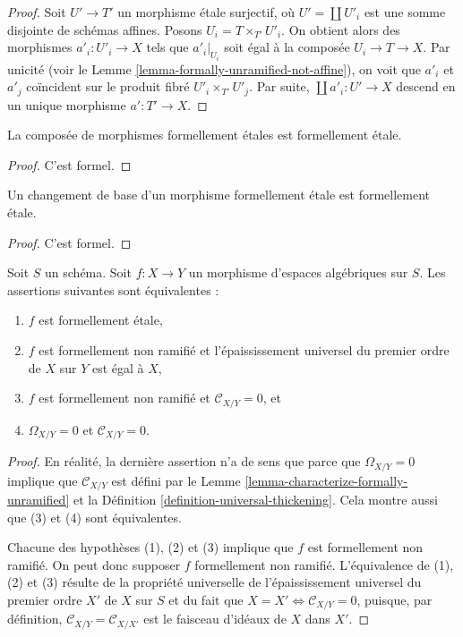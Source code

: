 \begin{proof}
Soit $U' \to T'$ un morphisme étale surjectif, où $U' = \coprod U'_i$
est une somme disjointe de schémas affines. Posons
$U_i = T \times_{T'} U'_i$. On obtient alors des morphismes
$a'_i : U'_i \to X$ tels que $a'_i|_{U_i}$ soit égal à la composée
$U_i \to T \to X$. Par unicité (voir le
Lemme \ref{lemma-formally-unramified-not-affine}),
on voit que $a'_i$ et $a'_j$ coïncident sur le produit fibré
$U'_i \times_{T'} U'_j$. Par suite, $\coprod a'_i : U' \to X$
descend en un unique morphisme $a' : T' \to X$.
\end{proof}

\begin{lemma}
\label{lemma-composition-formally-etale}
La composée de morphismes formellement étales est formellement étale.
\end{lemma}

\begin{proof}
C'est formel.
\end{proof}

\begin{lemma}
\label{lemma-base-change-formally-etale}
Un changement de base d'un morphisme formellement étale est formellement étale.
\end{lemma}

\begin{proof}
C'est formel.
\end{proof}

\begin{lemma}
\label{lemma-characterize-formally-etale}
Soit $S$ un schéma.
Soit $f : X \to Y$ un morphisme d'espaces algébriques sur $S$.
Les assertions suivantes sont équivalentes :
\begin{enumerate}
\item $f$ est formellement étale,
\item $f$ est formellement non ramifié et l'épaississement universel du premier ordre
de $X$ sur $Y$ est égal à $X$,
\item $f$ est formellement non ramifié et $\mathcal{C}_{X/Y} = 0$, et
\item $\Omega_{X/Y} = 0$ et $\mathcal{C}_{X/Y} = 0$.
\end{enumerate}
\end{lemma}

\begin{proof}
En réalité, la dernière assertion n'a de sens que parce que $\Omega_{X/Y} = 0$
implique que $\mathcal{C}_{X/Y}$ est défini par le
Lemme \ref{lemma-characterize-formally-unramified}
et la
Définition \ref{definition-universal-thickening}.
Cela montre aussi que (3) et (4) sont équivalentes.

\medskip\noindent
Chacune des hypothèses (1), (2) et (3) implique que $f$ est formellement
non ramifié. On peut donc supposer $f$ formellement non ramifié. L'équivalence
de (1), (2) et (3) résulte de la propriété universelle de l'épaississement
universel du premier ordre $X'$ de $X$ sur $S$ et du fait que
$X = X' \Leftrightarrow \mathcal{C}_{X/Y} = 0$, puisque,
par définition, $\mathcal{C}_{X/Y} = \mathcal{C}_{X/X'}$
est le faisceau d'idéaux de $X$ dans $X'$.
\end{proof}

